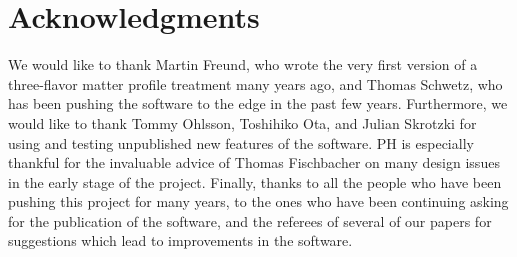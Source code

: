 \documentclass[a4paper,12pt,twoside]{book}
\newcommand{\AEDL}{{\sf AEDL}}
\begin{document}
%
%

\mainmatter







\chapter*{Acknowledgments}

We would like to thank Martin Freund, who wrote the very first
version of a three-flavor matter profile treatment many years ago,
and Thomas Schwetz, who has been pushing the software to the edge in the 
past few years. Furthermore, we would like to thank Tommy Ohlsson,
Toshihiko Ota, and Julian Skrotzki for using and testing unpublished new features of the software.
PH is especially thankful for the invaluable advice of Thomas Fischbacher on
many design issues in the early stage of the project.
Finally, thanks to all the people who have been pushing this project
for many years, to the ones who have been continuing asking for the
publication of the software, and the referees of several of our
papers for suggestions which lead to improvements in the software.
\end{document}

